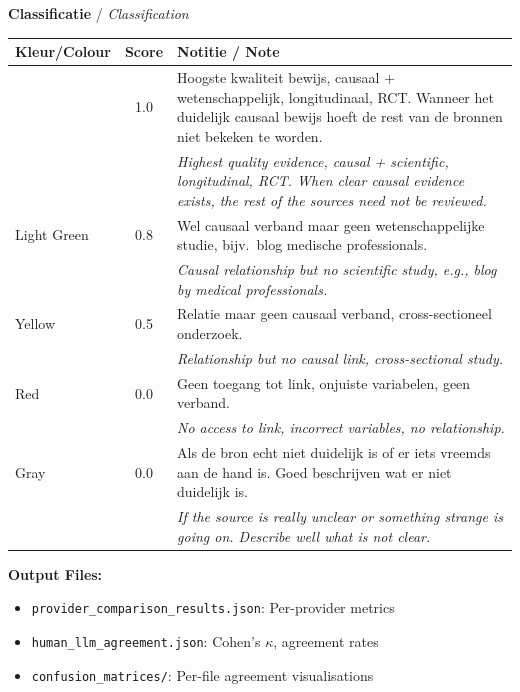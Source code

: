 \begin{table}[H]
\vspace{1em}

\textbf{Classificatie} / \textit{Classification}

\vspace{0.5em}

\begin{tabular}{|p{2cm}|c|p{8cm}|}
\hline
\textbf{Kleur/Colour} & \textbf{Score} & \textbf{Notitie / Note} \\
\hline
\cellcolor{green!70!black}\textcolor{white}{Dark Green} & 1.0 & 
Hoogste kwaliteit bewijs, causaal + wetenschappelijk, longitudinaal, RCT. Wanneer het duidelijk causaal bewijs hoeft de rest van de bronnen niet bekeken te worden. \\
\cellcolor{green!70!black} & & \textit{Highest quality evidence, causal + scientific, longitudinal, RCT. When clear causal evidence exists, the rest of the sources need not be reviewed.} \\
\hline
\cellcolor{green!50} Light Green & 0.8 & 
Wel causaal verband maar geen wetenschappelijke studie, bijv.\ blog medische professionals. \\
\cellcolor{green!50} & & \textit{Causal relationship but no scientific study, e.g., blog by medical professionals.} \\
\hline
\cellcolor{yellow!80} Yellow & 0.5 & 
Relatie maar geen causaal verband, cross-sectioneel onderzoek. \\
\cellcolor{yellow!80} & & \textit{Relationship but no causal link, cross-sectional study.} \\
\hline
\cellcolor{red!70} Red & 0.0 & 
Geen toegang tot link, onjuiste variabelen, geen verband. \\
\cellcolor{red!70} & & \textit{No access to link, incorrect variables, no relationship.} \\
\hline
\cellcolor{gray!50} Gray & 0.0 & 
Als de bron echt niet duidelijk is of er iets vreemds aan de hand is. Goed beschrijven wat er niet duidelijk is. \\
\cellcolor{gray!50} & & \textit{If the source is really unclear or something strange is going on. Describe well what is not clear.} \\
\hline
\end{tabular}

\end{table}

\textbf{Output Files:}
\begin{itemize}[noitemsep]
    \item \texttt{provider\_comparison\_results.json}: Per-provider metrics
    \item \texttt{human\_llm\_agreement.json}: Cohen's $\kappa$, agreement rates
    \item \texttt{confusion\_matrices/}: Per-file agreement visualisations
\end{itemize}

